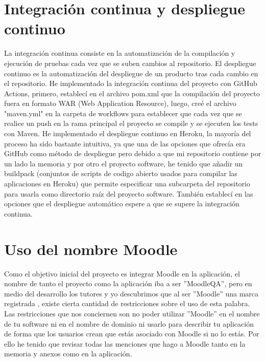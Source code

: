 \section{Integración continua y despliegue continuo}
La integración continua consiste en la automatización de la compilación y ejecución de pruebas cada vez que se suben cambios al repositorio.
El despliegue continuo es la automatización del despliegue de un producto tras cada cambio en el repositorio.
He implementado la integración continua del proyecto con GitHub Actions, primero, establecí en el archivo pom.xml que la compilación del proyecto fuera en formato WAR (Web Application Resource), luego, creé el archivo "maven.yml" en la carpeta de workflows para establecer que cada vez que se realice un push en la rama principal el proyecto se compile y se ejecuten los tests con Maven.
He implementado el despliegue continuo en Heroku, la mayoría del proceso ha sido bastante intuitiva, ya que una de las opciones que ofrecía era GitHub como método de despliegue pero debido a que mi repositorio contiene por un lado la memoria y por otro el proyecto software, he tenido que añadir un buildpack (conjuntos de scripts de codigo abierto usados para compilar las aplicaciones en Heroku) que permite especificar una subcarpeta del repositorio para usarla como directorio raíz del proyecto software. También establecí en las opciones que el despliegue automático espere a que se supere la integración continua.

\section{Uso del nombre Moodle}
Como el objetivo inicial del proyecto es integrar Moodle en la aplicación, el nombre de tanto el proyecto como la aplicación iba a ser ''MoodleQA'', pero en medio del desarrollo los tutores y yo descubrimos que al ser ''Moodle'' una marca registrada \cite{moodletrademark-2022}, existe cierta cantidad de restricciones sobre el uso de esta palabra. Las restricciones que nos conciernen son no poder utilizar ''Moodle'' en el nombre de tu software ni en el nombre de dominio ni usarlo para describir tu aplicación de forma que los usuarios crean que estás asociado con Moodle si no lo estás. Por ello he tenido que revisar todas las menciones que hago a Moodle tanto en la memoria y anexos como en la aplicación.


